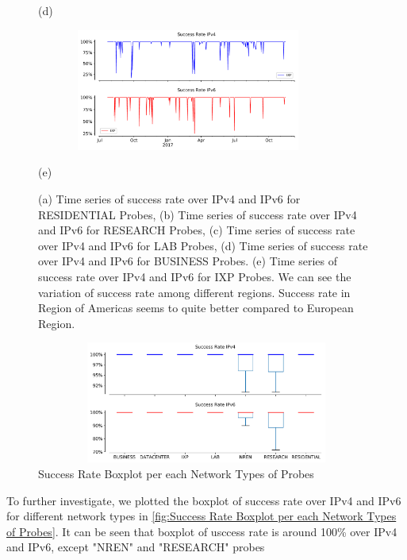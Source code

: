 \begin{figure}[!ht]
\begin{minipage}{0.5\textwidth}
		\caption[Timeseries of Success rate over IPv4 and IPv6 as per Business Probes]{(d)}
	\end{minipage}
	\begin{minipage}{0.5\textwidth}
		\centering
		\includegraphics[keepaspectratio, height=4cm, width=10cm]{figures/success/netflix-success-rate-timeseries-network-type-ixp.pdf}
		\caption[Timeseries of Success rate over IPv4 and IPv6 as per IXP Probe]{(e)}
	\end{minipage}
	\caption[Timeseries of Success rate over IPv4 and IPv6 as per different network types]{(a) Time series of success rate over IPv4 and IPv6 for RESIDENTIAL Probes, (b) Time series of success rate over IPv4 and IPv6 for RESEARCH Probes,
(c) Time series of success rate over IPv4 and IPv6 for LAB Probes, (d) Time series of success rate over IPv4 and IPv6 for BUSINESS Probes. (e) Time series of success rate over IPv4 and IPv6 for IXP Probes. We can see the variation of success rate among different regions. Success rate in Region of Americas seems to quite better compared to European Region.}
	\label{fig:Timeseries of Success rate over IPv4 and IPv6 for different Network Type}
\end{figure}
\begin{figure}[!ht]
	\centering
	\includegraphics[keepaspectratio, height=4cm, width=15cm]{figures/success/netflix-success-rate-boxplot-type.pdf}
	\caption{Success Rate Boxplot per each Network Types of Probes}
	\label{fig:Success Rate Boxplot per each Network Types of Probes}
\end{figure}
To further investigate, we plotted the boxplot of success rate over IPv4 and IPv6 for different network types in \cref{fig:Success Rate Boxplot per each Network 
Types of Probes}. It can be seen that boxplot of usccess rate is around 100\% over IPv4 and IPv6, except "NREN" and "RESEARCH" probes 
